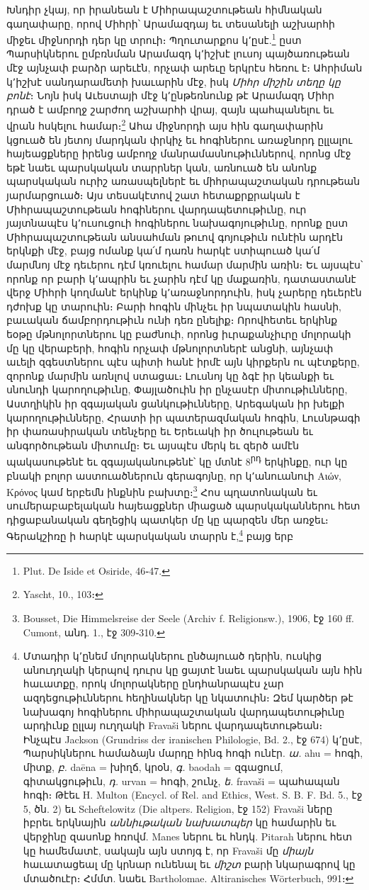 \documentclass{article}
\begin{document}
{Խնդիր չկայ, որ իրանեան է Միհրապաշտութեան հիմնական գաղափարը, որով Միհրի՝ Արամազդայ եւ տեսանելի աշխարհի միջեւ միջնորդի դեր կը տրուի։ Պղուտարքոս կ՚ըսէ.\footnote{Plut. De Iside et Osiride, 46֊47.} ըստ Պարսիկներու ըմբռնման Արամազդ կ՚իշխէ լուսոյ պայծառութեան մէջ այնչափ բարձր արեւէն, որչափ արեւը երկրէս հեռու է։ Ահրիման կ՚իշխէ սանդարամետի խաւարին մէջ, իսկ \emph{Միհր միշին տեղը կը բոնէ}։ Նոյն իսկ Աւեստայի մէջ կ՚ընթեռնունք թէ Արամազդ Միհր դրած է ամբողջ շարժող աշխարհի վրայ, զայն պահպանելու եւ վրան հսկելու համար։\footnote{Yascht, 10., 103։} Ահա միջնորդի այս հին գաղափարին կցուած են յետոյ մարդկան փրկիչ եւ հոգիներու առաջնորդ ըլլալու հայեացքները իրենց ամբողջ մանրամասնութիւններով, որոնց մէջ եթէ նաեւ պարսկական տարրներ կան, առնուած են անոնք պարսկական ուրիշ առասպելներէ եւ միհրապաշտական դրութեան յարմարցուած։ Այս տեսակէտով շատ հետաքրքրական է Միհրապաշտութեան հոգիներու վարդապետութիւնը, ուր յայտնապէս կ՚ուսուցուի հոգիներու նախագոյութիւնը, որոնք ըստ Միհրապաշտութեան անսահման թուով գոյութիւն ունէին արդէն երկնքի մէջ, բայց ոմանք կա՛մ դառն հարկէ ստիպուած կա՛մ մարմնոյ մէջ դեւերու դէմ կռուելու համար մարմին առին։ Եւ այսպէս՝ որոնք որ բարի կ՚ապրին եւ չարին դէմ կը մաքառին, դատաստանէ վերջ Միհրի կողմանէ երկինք կ՚առաջնորդուին, իսկ չարերը դեւերէն դժոխք կը տարուին։ Բարի հոգին մինչեւ իր նպատակին հասնի, բաւական ճամբորդութիւն ունի դեռ ընելիք։ Որովհետեւ երկինք եօթը մթնոլորտներու կը բաժնուի, որոնց իւրաքանչիւրը մոլորակի մը կը վերաբերի, հոգին որչափ մթնոլորտներէ անցնի, այնչափ աւելի զգեստներու պէս պիտի հանէ իրմէ այն կիրքերն ու պէտքերը, զորոնք մարմին առնլով ստացաւ։ Լուսնոյ կը ձգէ իր կեանքի եւ սնունդի կարողութիւնը, Փայլածուին իր ընչասէր միտութիւնները, Աստղիկին իր զգայական ցանկութիւնները, Արեգական իր խելքի կարողութիւնները, Հրատի իր պատերազմական հոգին, Լուսնթագի իր փառասիրական տենչերը եւ Երեւակի իր ծուլութեան եւ անգործութեան միտումը։ Եւ այսպէս մերկ եւ զերծ ամէն պակասութենէ եւ զգայականութենէ՝ կը մտնէ 8\textsuperscript{րդ} երկինքը, ուր կը բնակի բոլոր աստուածներուն գերագոյնը, որ կ՚անուանուի Αιών, Κρόνος կամ երբեմն ինքնին բախտը։\footnote{Bousset, Die Himmelsreise der Seele (Archiv f. Religionsw.), 1906, էջ 160 ff. Cumont, անդ. 1., էջ 309֊310.} Հոս պղատոնական եւ սումերաբաբելական հայեացքներ միացած պարսկականներու հետ դիցաբանական գեղեցիկ պատկեր մը կը պարզեն մեր առջեւ։ Գերակշիռը ի հարկէ պարսկական տարրն է,\footnote{Մտադիր կ՚ընեմ մոլորակներու ընծայուած դերին, ուսկից անուդղակի կերպով դուրս կը ցայտէ նաեւ պարսկական այն հին հաւատքը, որոկ մոլորակները ընդհանրապէս չար ազդեցութիւններու հեղինակներ կը նկատուին։ Զեմ կարծեր թէ նախագոյ հոգիներու միհրապաշտական վարդապետութիւնը արդիւնք ըլլայ ուղղակի Fravaši ներու վարդապետութեան։ Ինչպէս Jackson (Grundriss der iranischen Philologie, Bd. 2., էջ 674) կ՚ըսէ, Պարսիկներու համաձայն մարդը հինգ հոգի ունէր. \emph{ա.} ahu = հոգի, միտք, \emph{բ.} daēna = խիղճ, կրօն, \emph{գ.} baodah = զգացում, գիտակցութիւն, \emph{դ.} urvan = հոգի, շունչ, \emph{ե.} fravaši = պահապան հոգի։ Թէեւ H. Multon (Encycl. of Rel. and Ethics, West. S. B. F. Bd. 5., էջ 5, ծն. 2) եւ Scheftelowitz (Die altpers. Religion, էջ 152) Fravaši ները իբրեւ երկնային \emph{աննիւթական նախատպեր} կը համարին եւ վերջինը զասոնք հռովմ. Manes ներու եւ հնդկ. Pitarah ներու հետ կը համեմատէ, սակայն այն ստոյգ է, որ Fravaši մը \emph{միայն} հաւատացեալ մը կրնար ունենալ եւ \emph{միշտ} բարի նկարագրով կը մտածուէր։ Հմմտ. նաեւ Bartholomae. Altiranisches Wörterbuch, 991։} բայց երբ }
\end{document}
